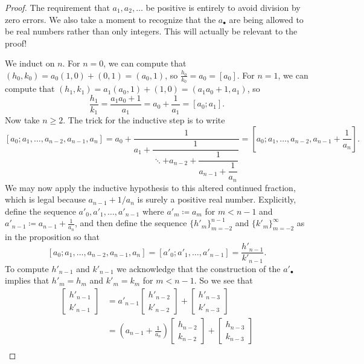 \documentclass[../notes.tex]{subfiles}
\begin{document}
\begin{proof}
	The requirement that $a_1,a_2,\ldots$ be positive is entirely to avoid division by zero errors. We also take a moment to recognize that the $a_\bullet$ are being allowed to be real numbers rather than only integers. This will actually be relevant to the proof!
	
	We induct on $n$. For $n=0$, we can compute that $(h_0,k_0)=a_0(1,0)+(0,1)=(a_0,1)$, so $\frac{h_0}{k_0}=a_0=[a_0]$. For $n=1$, we can compute that $(h_1,k_1)=a_1(a_0,1)+(1,0)=(a_1a_0+1,a_1)$, so
	\[\frac{h_1}{k_1}=\frac{a_1a_0+1}{a_1}=a_0+\frac1{a_1}=[a_0;a_1].\]
	Now take $n\ge2$. The trick for the inductive step is to write
	\[[a_0;a_1,\ldots,a_{n-2},a_{n-1},a_n] = a_0+\dfrac1{a_1+\dfrac1{\ddots+a_{n-2}+\dfrac1{a_{n-1}+\dfrac1{a_n}}}}=\left[a_0;a_1,\ldots,a_{n-2},a_{n-1}+\frac1{a_n}\right].\]
	We may now apply the inductive hypothesis to this altered continued fraction, which is legal because $a_{n-1}+1/a_n$ is surely a positive real number. Explicitly, define the sequence $a'_0,a'_1,\ldots,a'_{n-1}$ where $a'_m\coloneqq a_m$ for $m<n-1$ and $a'_{n-1}\coloneqq a_{n-1}+\frac1{a_n}$, and then define the sequence $\{h'_m\}_{m=-2}^{n-1}$ and $\{k'_m\}_{m=-2}^\infty$ as in the proposition so that
	\[[a_0;a_1,\ldots,a_{n-2},a_{n-1},a_n]=[a'_0;a'_1,\ldots,a'_{n-1}]=\frac{h'_{n-1}}{k'_{n-1}}.\]
	To compute $h'_{n-1}$ and $k'_{n-1}$ we acknowledge that the construction of the $a'_\bullet$ implies that $h'_m=h_m$ and $k'_m=k_m$ for $m<n-1$. So we see that
	\begin{align*}
		\begin{bmatrix}
			h'_{n-1} \\
			k'_{n-1}
		\end{bmatrix} &= a'_{n-1}\begin{bmatrix}
			h'_{n-2} \\
			k'_{n-2}
		\end{bmatrix}+\begin{bmatrix}
			h'_{n-3} \\
			k'_{n-3}
		\end{bmatrix} \\
		&= \left(a_{n-1}+\frac1{a_n}\right)\begin{bmatrix}
			h_{n-2} \\
			k_{n-2}
		\end{bmatrix}+\begin{bmatrix}
			h_{n-3} \\
			k_{n-3}
		\end{bmatrix} \\

\end{align*}
\end{proof}
\end{document}
